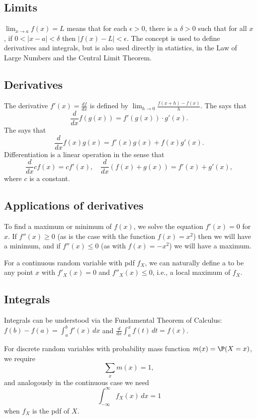 \label{calculus}

\subsection{Limits}

$\lim_{x\to a}f(x)=L$ means that for each $\epsilon>0$, there is a $\delta>0$ such that for all $x$, if $0<|x-a|<\delta$ then $|f(x)-L|<\epsilon$.
The concept is used to define derivatives and integrals, but is also used directly in statistics, in the Law of Large Numbers and the Central Limit Theorem.

\subsection{Derivatives}

	The derivative $f'(x)=\frac{df}{dx}$ is defined by $\lim_{h\to 0}\frac{f(x+h)-f(x)}h$. The  says that
	\[
		\frac{d}{dx}f(g(x))=f'(g(x))\cdot g'(x).
	\]
	The  says that
	\[
		\frac{d}{dx} f(x)g(x) = f'(x)g(x)+f(x)g'(x).
	\]
	Differentiation is a linear operation in the sense that
	\[
		\frac{d}{dx} cf(x)=cf'(x),\quad \frac{d}{dx}(f(x)+g(x)) = f'(x)+g'(x),
	\]
	where $c$ is a constant.

\subsection{Applications of derivatives}%

	To find a maximum or minimum of $f(x)$, we solve the equation $f'(x)=0$ for $x$.
	If $f''(x)\ge 0$ (as is the case with the function $f(x)=x^2$) then we will have a minimum,
	and if $f''(x)\le 0$ (as with $f(x)=-x^2$) we will have a maximum.

	For a continuous random variable with pdf $f_X$, we can naturally define a  to be
	any point $x$ with $f'_X(x)=0$ and $f''_X(x)\le 0$, i.e., a local maximum of $f_X$.

\subsection{Integrals}
	Integrals can be understood via the Fundamental Theorem of Calculus: $f(b)-f(a)=\int_a^b f'(x)\,dx$ and $\frac{d}{dx}\int_a^x f(t)\,dt=f(x)$.

	For discrete random variables with probability mass function $m(x)=\P(X=x)$, we require
	\[
	\sum_x m(x)=1,
	\]
	and analogously in the continuous case we need
	\[
	\int_{-\infty}^\infty f_X(x)\,dx=1
	\]
	when $f_X$ is the pdf of $X$.
